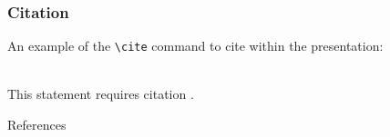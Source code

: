 \documentclass[aspectratio=169,xcolor=dvipsnames, t]{beamer}
\begin{document}
\begin{frame}[fragile] %
    \frametitle{Citation}
    An example of the \verb|\cite| command to cite within the presentation:\\~

    This statement requires citation \cite{rizzi_1976}.
\end{frame}

\begin{frame}[allowframebreaks]{References}
\end{frame}

\makefinalpage
\end{document}
